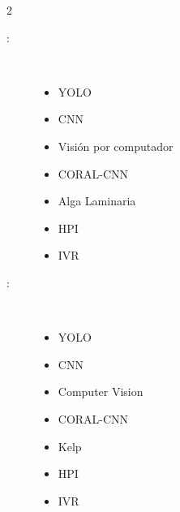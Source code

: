 \begin{multicols}{2}
\begin{description}
\item [\palabraschaveprincipal:] \mbox{} \\[-20pt]
  \begin{itemize}
      \item YOLO
      \item CNN
      \item Visión por computador
      \item CORAL-CNN
      \item Alga Laminaria
      \item HPI
      \item IVR
  \end{itemize}
\end{description}
\begin{description}
\item [\palabraschavesecundaria:] \mbox{} \\[-20pt]
  \begin{itemize}
      \item YOLO
      \item CNN
      \item Computer Vision
      \item CORAL-CNN
      \item Kelp
      \item HPI
      \item IVR
  \end{itemize}
\end{description}
\end{multicols}
